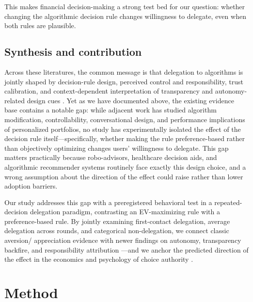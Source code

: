 \documentclass[a4paper, 12pt, fleqn]{article}
\theoremstyle{definition}
\newcommand{\inew}[1]{{\color{blue} #1\color{black}}}
\begin{document}
This makes financial decision-making a strong test bed for our question: whether changing the algorithmic decision rule changes willingness to delegate, even when both rules are plausible.

\subsection{Synthesis and contribution}
Across these literatures, the common message is that delegation to algorithms is jointly shaped by decision-rule design, perceived control and responsibility, trust calibration, and context-dependent interpretation of transparency and autonomy-related design cues \citep{Dietvorst2018,Chugunova2022,Schaap2024,Fink2024,Hu2024}. Yet as we have documented above, the existing evidence base contains a notable gap: while adjacent work has studied algorithm modification, controllability, conversational design, and performance implications of personalized portfolios, no study has experimentally isolated the effect of the decision rule itself---specifically, whether making the rule preference-based rather than objectively optimizing changes users' willingness to delegate. This gap matters practically because robo-advisors, healthcare decision aids, and algorithmic recommender systems routinely face exactly this design choice, and a wrong assumption about the direction of the effect could raise rather than lower adoption barriers.

Our study addresses this gap with a preregistered behavioral test in a repeated-decision delegation paradigm, contrasting an EV-maximizing rule with a preference-based rule. By jointly examining first-contact delegation, average delegation across rounds, and categorical non-delegation, we connect classic aversion/ appreciation evidence with newer findings on autonomy, transparency backfire, and responsibility attribution \citep{Logg2019,Fink2024,Hu2024,Gazit2023}\inew{---and we anchor the predicted direction of the effect in the economics and psychology of choice authority \citep{Brehm1966,DeciRyan2000,FreyBenzStutzer2004,Leotti2010,Bartling2014,Owens2014}}.

\section{Method}
\label{sec:method}
\end{document}
